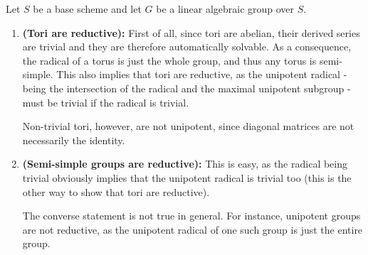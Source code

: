                     \begin{remark} \label{remark: tori_and_reductive_groups}
                        Let $S$ be a base scheme and let $G$ be a linear algebraic group over $S$.
                        \begin{enumerate}
                            \item \textbf{(Tori are reductive):} First of all, since tori are abelian, their derived series are trivial and they are therefore automatically solvable. As a consequence, the radical of a torus is just the whole group, and thus any torus is semi-simple. This also implies that tori are reductive, as the unipotent radical - being the intersection of the radical and the maximal unipotent subgroup - must be trivial if the radical is trivial.
                            
                            Non-trivial tori, however, are not unipotent, since diagonal matrices are not necessarily the identity.
                            \item \textbf{(Semi-simple groups are reductive):} This is easy, as the radical being trivial obviously implies that the unipotent radical is trivial too (this is the other way to show that tori are reductive). 
                            
                            The converse statement is not true in general. For instance, unipotent groups are not reductive, as the unipotent radical of one such group is just the entire group.
                        \end{enumerate}
                    \end{remark}
                    
